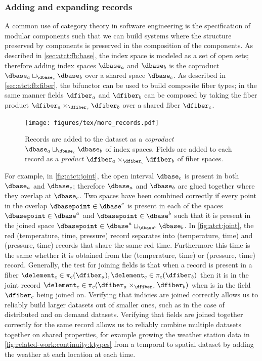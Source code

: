 \documentclass[journal]{IEEEtran}
\theoremstyle{definition}
\theoremstyle{remark}
\begin{document}
\subsubsection{Adding and expanding records}

A common use of category theory in software engineering is the specification of modular components \cite{wielsManagementEvolvingSpecifications1998} such that we can build systems where the structure preserved by components is preserved in the composition of the components. As described in \autoref{sec:atct:fb:base}, the index space is modeled as a set of open sets; therefore adding index spaces $\dbase_a$ and $\dbase_b$ is the coproduct $\dbase_{a} \sqcup_{\dbase_{c}} \dbase_{b}$ over a shared space $\dbase_{c}$. As described in \autoref{sec:atct:fb:fiber}, the bifunctor can be used to build composite fiber types;  in the same manner fields $\dfiber_a$ and $\dfiber_b$ can be composed by taking the fiber product $\dfiber_{a}\times_{\dfiber_{c}} \dfiber_b$ over a shared fiber $\dfiber_c$.


\begin{figure}[H]
  \texttt{[image: figures/tex/more\_records.pdf]}
  \caption{Records are added to the dataset as a \textit{coproduct} $\dbase_{a}\sqcup_{\dbase_c} \dbase_{b}$ of index spaces. Fields are added to each record as a \textit{product} $\dfiber_{a}\times_{\dfiber_c} \dfiber_{b}$ of fiber spaces.}
  \label{fig:atct:joint}
\end{figure}

For example, in \autoref{fig:atct:joint}, the open interval $\dbase_c$ is present in both $\dbase_a$ and $\dbase_c$; therefore $\dbase_a$ and $\dbase_b$ are glued together where they overlap at $\dbase_c$.  Two spaces have been combined correctly if every point in the overlap  $\dbasepoint \in \dbase^{c}$ is present in each of the spaces $\dbasepoint \in \dbase^{a}$ and $\dbasepoint \in \dbase^{b}$ such that it is present in the joined space $\dbasepoint \in \dbase^{a}\sqcup_{\dbase^{c}} \dbase_{b}$. In \autoref{fig:atct:joint}, the red (temperature, time, pressure) record separates into (temperature, time) and (pressure, time) records that share the same red time. Furthermore this time is the same whether it is obtained from the (temperature, time) or (pressure, time) record. Generally, the test for joining fields is that when a record is present in a fiber $\delement_{c} \in \pi_c(\dfiber_{a}), \delement_c \in \pi_c(\dfiber_{b})$ then it is in the joint record $\delement_{c} \in \pi_c(\dfiber_{a}\times_{\dfiber_c}\dfiber_{b})$ when is in the field $\dfiber_c$ being joined on. Verifying that indicies are joined correctly allows us to reliably build larger datasets out of smaller ones, such as in the case of distributed and on demand datasets. Verifying that fields are joined together correctly for the same record allows us to reliably combine multiple datasets together on shared properties, for example growing the weather station data in \autoref{fig:related-work:continuity:ktypes} from a temporal to spatial dataset by adding the weather at each location at each time.
\end{document}
